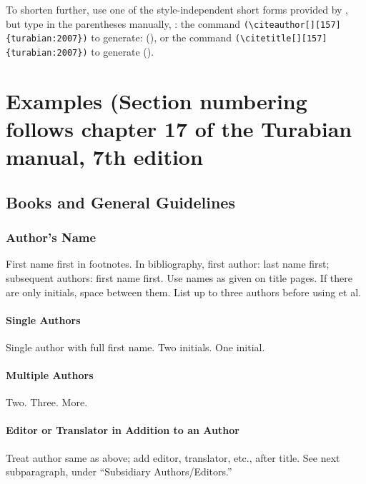 \documentclass{ltxdockit}[2010/02/12]
\begin{document}
To shorten further, use one of the style-independent short forms provided by , but type in the parentheses manually, \eg:
the  command \verb|(\citeauthor[][157]{turabian:2007})| to generate: (\citeauthor[][157]{turabian:2007}), or
the  command \verb|(\citetitle[][157]{turabian:2007})| to generate ().







\section{Examples (Section numbering follows chapter 17 of the Turabian manual, 7th edition}
\subsection{Books and General Guidelines}
\subsubsection{Author's Name}
\label{bookauthors}
First name first in footnotes. In bibliography, first author: last name first; subsequent authors: first name first. Use names as given on title pages. If there are only initials, space between them. List up to three authors before using et al.
\paragraph{Single Authors}
Single author with full first name.\autocites[][]{olby1985origins-of-mend1}
Two initials.\autocites[][]{1440}
One initial.\autocites[][]{2362}
\paragraph{Multiple Authors}
Two.\autocites[][]{1066}
Three.\autocites[][]{baur:1923}
More.\autocites[][]{1259}
\paragraph{Editor or Translator in Addition to an Author}
Treat author same as above; add editor, translator, etc., after title. See next subparagraph, under ``Subsidiary Authors/Editors.''
\end{document}
